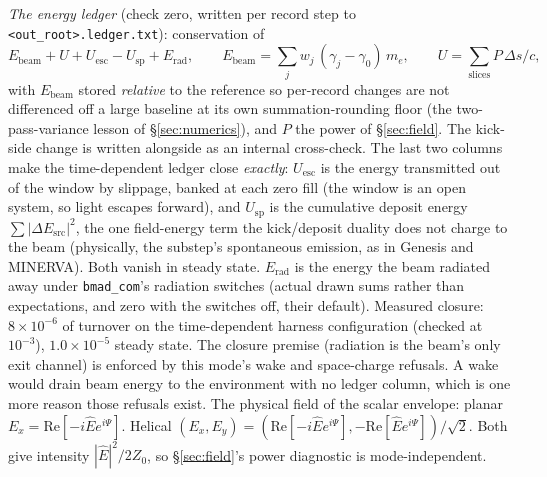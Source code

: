 \documentclass[11pt]{article}
\newcommand{\code}[1]{\texttt{#1}}
\begin{document}
\emph{The energy ledger} (check zero, written per record step to
\code{<out\_root>.ledger.txt}): conservation of
\begin{equation}\label{eq:ledger}
  E_{\mathrm{beam}} + U + U_{\mathrm{esc}} - U_{\mathrm{sp}} + E_{\mathrm{rad}}, \qquad
  E_{\mathrm{beam}} = \sum_j w_j\,(\gamma_j - \gamma_0)\, m_e, \qquad
  U = \sum_{\mathrm{slices}} P\,\Delta s/c,
\end{equation}
with $E_{\mathrm{beam}}$ stored \emph{relative} to the reference so per-record
changes are not differenced off a large baseline at its own summation-rounding floor
(the two-pass-variance lesson of \S\ref{sec:numerics}), and $P$ the power of
\S\ref{sec:field}. The kick-side change is written alongside as an internal
cross-check. The last two columns make the time-dependent ledger close
\emph{exactly}: $U_{\mathrm{esc}}$ is the energy transmitted out of the window by
slippage, banked at each zero fill (the window is an open system, so light escapes
forward), and $U_{\mathrm{sp}}$ is the cumulative deposit energy
$\sum|\Delta E_{\mathrm{src}}|^2$, the one field-energy term the kick/deposit
duality does not charge to the beam (physically, the substep's spontaneous emission,
as in Genesis and MINERVA). Both vanish in steady state. $E_{\mathrm{rad}}$ is the energy the beam radiated away
under \code{bmad\_com}'s radiation switches (actual drawn sums rather than expectations,
and zero with the switches off, their default). Measured closure:
$8\times10^{-6}$ of turnover on the time-dependent harness configuration (checked at
$10^{-3}$), $1.0\times10^{-5}$ steady state. The closure premise (radiation is the
beam's only exit channel) is enforced by this mode's wake and space-charge
refusals. A wake would drain beam energy to the environment with no ledger column,
which is one more reason those refusals exist. The physical field of the
scalar envelope: planar $E_x = \mathrm{Re}[-i\hat E e^{i\Psi}]$. Helical
$(E_x, E_y) = (\mathrm{Re}[-i\hat E e^{i\Psi}], -\mathrm{Re}[\hat E e^{i\Psi}])/\sqrt2$.
Both give intensity $|\hat E|^2/2Z_0$, so \S\ref{sec:field}'s power diagnostic is
mode-independent.
\end{document}
